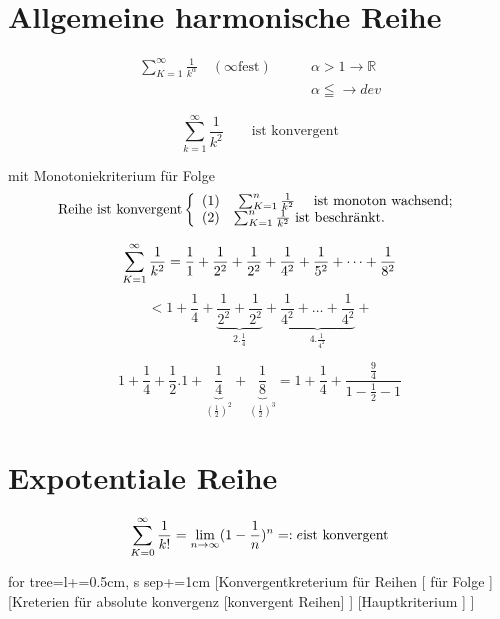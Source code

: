 \section{Allgemeine harmonische Reihe}

				\begin{equation*}
				\begin{split}
				 \sum_{K=1}^{\infty} \frac{1}{k^\alpha} \quad( \infty \text{fest}) \qquad
				& \alpha > 1 \rightarrow \mathbb{R}  \\
				& \alpha \leqq \rightarrow dev
				\end{split}
				\end{equation*}
 \begin{example}
 	\[ \sum_{k=1}^{\infty} \frac{1}{k^2} \qquad \text{ist konvergent}\]
 	
\begin{beweis}{mit Monotoniekriterium für Folge}  
		\[ \text{Reihe ist konvergent} \left\{ \begin{array}{ll}
	   (1) & \mbox{ $\sum_{K=1}^{n} \frac{1}{k^2} $ \quad ist monoton wachsend};\\
	   (2) & \mbox{$\sum_{K=1}^{n} \frac{1}{k^2} $ \text{ist beschränkt}}.\end{array} \right. \] 
	   	
	   \[ \sum_{K=1}^{\infty} \frac{1}{k^2} = \frac{1}{1}+\frac{1}{2^2}+\frac{1}{2^2}+\frac{1}{4^2}+\frac{1}{5^2}+  \dots + \frac{1}{8^2}  \]
	   \[ <  1 + \frac{1}{4}+\underbrace{\frac{1}{2^2}+\frac{1}{2^2}}_{2. \frac{1}{4}}+\underbrace{\frac{1}{4^2}+\dots + \frac{1}{4^2}}_{4.\frac{1}{4^2}}+\]
	   
	   \[ 1+\frac{1}{4}+\frac{1}{2}.1+\underbrace{\frac{1}{4}}_{(\frac{1}{2})^2}+\underbrace{\frac{1}{8}}_{(\frac{1}{2})^3} =1+\frac{1}{4}+\frac{\frac{9}{4} }{1-\frac{1}{2}-1} \]
	   
 \end{beweis}
 \end{example}
\section{Expotentiale Reihe}

\[ \sum_{K=0}^{\infty} \frac{1}{k!} = \lim\limits_{n \rightarrow \infty} ( 1-\frac{1}{n})^n =:e \text{ist konvergent} \]

	\begin{forest}
	for tree={l+=0.5cm, s sep+=1cm}
	[Konvergentkreterium für Reihen 
	[	für Folge ]
	[Kreterien für absolute konvergenz [konvergent Reihen] ]
	[Hauptkriterium ]
	]
	\end{forest}

